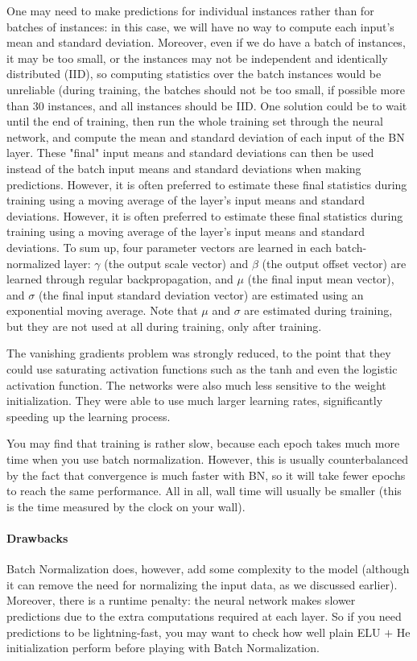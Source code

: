\documentclass[12pt, letterpaper]{article}
\theoremstyle{definition}
\let\tb\textbf
\begin{document}
One may need to make predictions for individual instances rather than for batches of instances: in this case, we will have no way to compute each input's mean and standard deviation. Moreover, even if we do have a batch of instances, it may be too small, or the instances may not be independent and identically distributed (IID), so computing statistics over the batch instances would be unreliable (during training, the batches should not be too small, if possible more than 30 instances, and all instances should be IID.  One solution could be to wait until the end of training, then run the whole training set through the neural network, and compute the mean and standard deviation of each input of the BN layer. These "final" input means and standard deviations can then be used instead of the batch input means and standard deviations when making predictions. However, it is often preferred to estimate these final statistics during training using a moving average of the layer's input means and standard deviations.  However, it is often preferred to estimate these final statistics during training using a moving average of the layer's input means and standard deviations. To sum up, four parameter vectors are learned in each batch-normalized layer: $\gamma$ (the output scale vector) and $\beta$ (the output offset vector) are learned through regular backpropagation, and $\mu$ (the final input mean vector), and $\sigma$ (the final input standard deviation vector) are estimated using an exponential moving average. Note that $\mu$ and $\sigma$ are estimated during training, but they are not used at all during training, only after training.

The vanishing gradients problem was strongly reduced, to the point that they could use saturating activation functions such as the tanh and even the logistic activation function. The networks were also much less sensitive to the weight initialization. They were able to use much larger learning rates, significantly speeding up the learning process.
 
You may find that training is rather slow, because each epoch takes much more time when you use batch normalization. However, this is usually counterbalanced by the fact that convergence is much faster with BN, so it will take fewer epochs to reach the same performance. All in all, wall time will usually be smaller (this is the time measured by the clock on your wall). 
 
\paragraph{\tb{Drawbacks}} Batch Normalization does, however, add some complexity to the model (although it can remove the need for normalizing the input data, as we discussed earlier). Moreover, there is a runtime penalty: the neural network makes slower predictions due to the extra computations required at each layer. So if you need predictions to be lightning-fast, you may want to check how well plain ELU $+$ He initialization perform before playing with Batch Normalization. 
\end{document}
